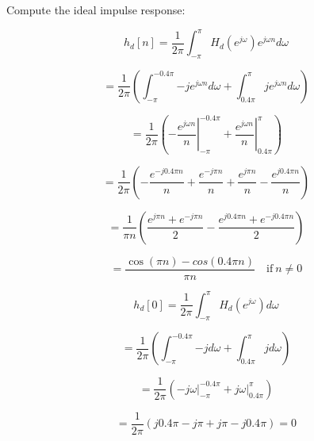 \documentclass[fleqn]{article}
\begin{document}
\begin{enumerate}[nolistsep]
		Compute the ideal impulse response:
		
		\begin{equation*}
			h_d[n] = \frac{1}{2\pi}\int_{-\pi}^{\pi}{H_d(e^{j\omega})e^{j{\omega}n}d\omega}			
		\end{equation*}
		
		\begin{equation*}
			= \frac{1}{2\pi}\left(\int_{-\pi}^{-0.4\pi}{-je^{j{\omega}n}d\omega} + \int_{0.4\pi}^{\pi}{je^{j{\omega}n}d\omega}\right)		
		\end{equation*}
		
		\begin{equation*}
			= \frac{1}{2\pi}\left(-\left.\frac{e^{j{\omega}n}}{n}\right\vert_{-\pi}^{-0.4\pi} + \left.\frac{e^{j{\omega}n}}{n}\right\vert_{0.4\pi}^{\pi}\right)		
		\end{equation*}
		
		\begin{equation*}
			= \frac{1}{2\pi}\left(-\frac{e^{-j0.4{\pi}n}}{n} + \frac{e^{-j{\pi}n}}{n} + \frac{e^{j{\pi}n}}{n} - \frac{e^{j0.4{\pi}n}}{n}\right)		
		\end{equation*}
		
		\begin{equation*}
			= \frac{1}{{\pi}n}\left(\frac{e^{j{\pi}n} + e^{-j{\pi}n}}{2} - \frac{e^{j0.4{\pi}n} + e^{-j0.4{\pi}n}}{2}\right)		
		\end{equation*}
		
		\begin{equation*}
			= \frac{\cos{({\pi}n)} - cos{(0.4{\pi}n)}}{{\pi}n}\quad \text{if}\ n \neq 0
		\end{equation*}
		
		\begin{equation*}
			h_d[0] = \frac{1}{2\pi}\int_{-\pi}^{\pi}{H_d(e^{j\omega})d\omega}			
		\end{equation*}
		
		\begin{equation*}
			= \frac{1}{2\pi}\left(\int_{-\pi}^{-0.4\pi}{-jd\omega} + \int_{0.4\pi}^{\pi}{jd\omega}\right)
		\end{equation*}
				
		\begin{equation*}
			= \frac{1}{2\pi}\left(\left.-j\omega\right\vert_{-\pi}^{-0.4\pi} + \left.j\omega\right\vert_{0.4\pi}^{\pi}\right)
		\end{equation*}
		
		\begin{equation*}
			= \frac{1}{2\pi}\left(j0.4\pi - j\pi + j\pi - j0.4\pi\right) = 0
		\end{equation*}
		

\end{enumerate}
\end{document}
